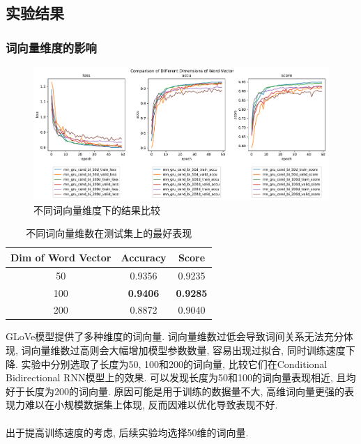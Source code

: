 \documentclass[a4paper]{article}
\begin{document}
	\subsection{实验结果}
	\subsubsection{词向量维度的影响}
	\begin{figure}[H]
		\centering
		\includegraphics[width=\textwidth]{comparison_of_different_dimensions_of_word_vector.pdf}
		\caption{不同词向量维度下的结果比较}
		\label{comparison_of_different_dimensions_of_word_vector}
	\end{figure}
	\begin{table}[H]
		\centering
		\caption{不同词向量维数在测试集上的最好表现}
		\label{dimperf}
		\begin{tabular}{@{}ccc@{}}
			\toprule
			\textbf{Dim of Word Vector}                  & \textbf{Accuracy} & \textbf{Score}  \\ \midrule
			50   & 0.9356            & 0.9235          \\
			100                 & \textbf{0.9406}            & \textbf{0.9285}          \\
			200                & 0.8872            & 0.9040          \\ \bottomrule
		\end{tabular}
	\end{table}
	GLoVe模型提供了多种维度的词向量. 词向量维数过低会导致词间关系无法充分体现, 词向量维数过高则会大幅增加模型参数数量, 容易出现过拟合, 同时训练速度下降. 实验中分别选取了长度为50, 100和200的词向量, 比较它们在Conditional Bidirectional RNN模型上的效果. 可以发现长度为50和100的词向量表现相近, 且均好于长度为200的词向量. 原因可能是用于训练的数据量不大, 高维词向量更强的表现力难以在小规模数据集上体现, 反而因难以优化导致表现不好.\\\\ 出于提高训练速度的考虑, 后续实验均选择50维的词向量.
\end{document}
